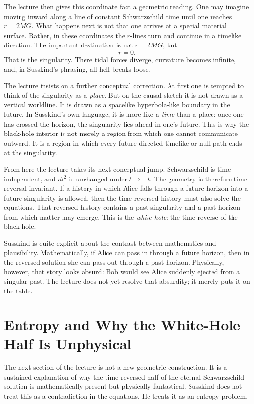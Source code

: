 The lecture then gives this coordinate fact a geometric reading. One may imagine moving inward along a line of constant Schwarzschild time until one reaches \(r=2MG\). What happens next is not that one arrives at a special material surface. Rather, in these coordinates the \(r\)-lines turn and continue in a timelike direction. The important destination is not \(r=2MG\), but
\begin{equation}
r=0.
\end{equation}
That is the singularity. There tidal forces diverge, curvature becomes infinite, and, in Susskind's phrasing, all hell breaks loose.

The lecture insists on a further conceptual correction. At first one is tempted to think of the singularity as a \emph{place}. But on the causal sketch it is not drawn as a vertical worldline. It is drawn as a spacelike hyperbola-like boundary in the future. In Susskind's own language, it is more like a \emph{time} than a place: once one has crossed the horizon, the singularity lies ahead in one's future. This is why the black-hole interior is not merely a region from which one cannot communicate outward. It is a region in which every future-directed timelike or null path ends at the singularity.

From here the lecture takes its next conceptual jump. Schwarzschild is time-independent, and \(dt^2\) is unchanged under \(t\to -t\). The geometry is therefore time-reversal invariant. If a history in which Alice falls through a future horizon into a future singularity is allowed, then the time-reversed history must also solve the equations. That reversed history contains a past singularity and a past horizon from which matter may emerge. This is the \emph{white hole}: the time reverse of the black hole.

Susskind is quite explicit about the contrast between mathematics and plausibility. Mathematically, if Alice can pass in through a future horizon, then in the reversed solution she can pass out through a past horizon. Physically, however, that story looks absurd: Bob would see Alice suddenly ejected from a singular past. The lecture does not yet resolve that absurdity; it merely puts it on the table.

\section{Entropy and Why the White-Hole Half Is Unphysical}

The next section of the lecture is not a new geometric construction. It is a sustained explanation of why the time-reversed half of the eternal Schwarzschild solution is mathematically present but physically fantastical. Susskind does not treat this as a contradiction in the equations. He treats it as an entropy problem.

